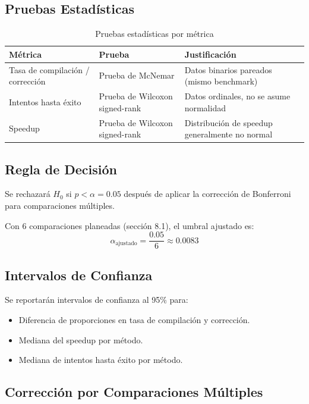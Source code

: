 \documentclass[12pt]{article}
\begin{document}
\subsection{Pruebas Estadísticas}

\begin{table}[H]
\centering
\caption{Pruebas estadísticas por métrica}
\begin{tabular}{lll}
\toprule
\textbf{Métrica} & \textbf{Prueba} & \textbf{Justificación} \\
\midrule
Tasa de compilación / corrección & Prueba de McNemar &
  Datos binarios pareados (mismo benchmark) \\
Intentos hasta éxito & Prueba de Wilcoxon signed-rank &
  Datos ordinales, no se asume normalidad \\
Speedup & Prueba de Wilcoxon signed-rank &
  Distribución de speedup generalmente no normal \\
\bottomrule
\end{tabular}
\end{table}

\subsection{Regla de Decisión}

Se rechazará $H_0$ si $p < \alpha = 0.05$ después de aplicar la corrección de
Bonferroni para comparaciones múltiples.

Con 6 comparaciones planeadas (sección 8.1), el umbral ajustado es:
\[\alpha_{\text{ajustado}} = \frac{0.05}{6} \approx 0.0083\]

\subsection{Intervalos de Confianza}

Se reportarán intervalos de confianza al 95\% para:
\begin{itemize}
  \item Diferencia de proporciones en tasa de compilación y corrección.
  \item Mediana del speedup por método.
  \item Mediana de intentos hasta éxito por método.
\end{itemize}

\subsection{Corrección por Comparaciones Múltiples}
\end{document}
